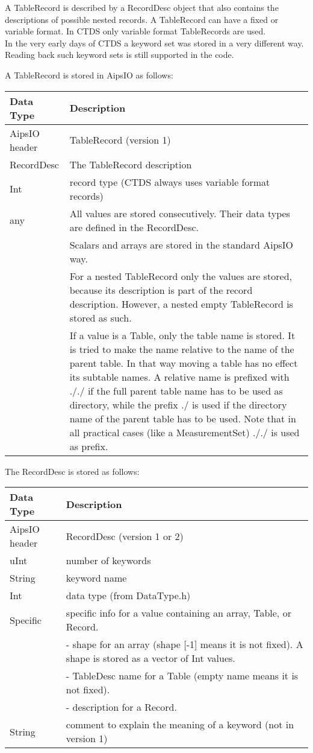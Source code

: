 A TableRecord is described by a RecordDesc object that also
contains the descriptions of possible nested records. A TableRecord
can have a fixed or variable format. In CTDS only variable format
TableRecords are used.
\\In the very early days of CTDS a keyword set was stored in a very
different way. Reading back such keyword sets is still supported in
the code.

A TableRecord is stored in AipsIO as follows:

\vspace{0.15in}
\begin{tabular}{|l|p{13cm}|} \hline
  Data Type & Description \\ \hline\hline
  AipsIO header & TableRecord (version 1) \\
  RecordDesc & The TableRecord description \\
  Int & record type (CTDS always uses variable format records) \\
  any & All values are stored consecutively.
  Their data types are defined in the RecordDesc.
   \tabularnewline & Scalars and arrays are stored in the standard AipsIO way.
   \tabularnewline & For a nested TableRecord only the values are
   stored, because its description is part of the record
   description. However, a nested empty TableRecord is stored as such.
  \tabularnewline & If a value is a Table, only the table name is
  stored. It is tried to make the name relative to the
  name of the parent table. In that way moving a table has no effect
  its subtable names. A relative name is prefixed with
  ././ if the full parent table name has to be used as
  directory, while the prefix ./ is used if the directory name of
  the parent table has to be used. Note that in all practical cases
  (like a MeasurementSet) ././ is used as prefix. \\
  \hline
\end{tabular}
\vspace{0.15in}

The RecordDesc is stored as follows:

\vspace{0.15in}
\begin{tabular}{|l|p{13cm}|} \hline
  Data Type & Description \\ \hline\hline
  AipsIO header & RecordDesc (version 1 or 2) \\
  uInt & number of keywords \\
  String & keyword name \\
  Int & data type (from DataType.h) \\
  Specific & specific info for a value containing an array, Table, or Record.
  \tabularnewline & - shape for an array (shape [-1] means it is not
  fixed). A shape is stored as a vector of Int values.
  \tabularnewline & - TableDesc name for a Table (empty name means it is not fixed).
  \tabularnewline & - description for a Record. \\
  String & comment to explain the meaning of a keyword (not in version 1) \\
  \hline
\end{tabular}
\vspace{0.15in}

